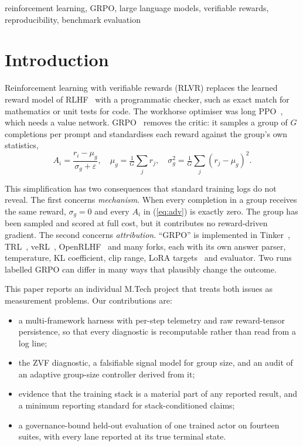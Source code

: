 \documentclass[conference]{IEEEtran}
\begin{document}
\begin{IEEEkeywords}
reinforcement learning, GRPO, large language models, verifiable rewards,
reproducibility, benchmark evaluation
\end{IEEEkeywords}

\section{Introduction}

Reinforcement learning with verifiable rewards (RLVR) replaces the learned
reward model of RLHF~\cite{ouyang2022training} with a programmatic checker,
such as exact match for mathematics or unit tests for code. The workhorse
optimiser was long PPO~\cite{schulman2017proximal}, which needs a value
network. GRPO~\cite{shao2024deepseekmath,guo2025deepseekr1} removes the critic:
it samples a group of $G$ completions per prompt and standardises each reward
against the group's own statistics,
\begin{equation}
A_i = \frac{r_i - \mu_g}{\sigma_g + \varepsilon}, \quad
\mu_g = \tfrac{1}{G}\textstyle\sum_j r_j, \quad
\sigma_g^2 = \tfrac{1}{G}\textstyle\sum_j (r_j-\mu_g)^2 .
\label{eq:adv}
\end{equation}

This simplification has two consequences that standard training logs do not
reveal. The first concerns \emph{mechanism}. When every completion in a group
receives the same reward, $\sigma_g = 0$ and every $A_i$ in (\ref{eq:adv}) is
exactly zero. The group has been sampled and scored at full cost, but it
contributes no reward-driven gradient. The second concerns
\emph{attribution}. ``GRPO'' is implemented in Tinker~\cite{thinkingmachines2024tinker},
TRL~\cite{vonwerra2022trl}, veRL~\cite{sheng2024verl},
OpenRLHF~\cite{hu2024openrlhf} and many forks, each with its own answer
parser, temperature, KL coefficient, clip range, LoRA targets~\cite{hu2022lora}
and evaluator. Two runs labelled GRPO can differ in many ways that plausibly
change the outcome.

This paper reports an individual M.Tech project that treats both issues as
measurement problems. Our contributions are:
\begin{itemize}
\item a multi-framework harness with per-step telemetry and raw reward-tensor
persistence, so that every diagnostic is recomputable rather than read from a
log line;
\item the ZVF diagnostic, a falsifiable signal model for group size, and an
audit of an adaptive group-size controller derived from it;
\item evidence that the training stack is a material part of any reported
result, and a minimum reporting standard for stack-conditioned claims;
\item a governance-bound held-out evaluation of one trained actor on fourteen
suites, with every lane reported at its true terminal state.
\end{itemize}
\end{document}
